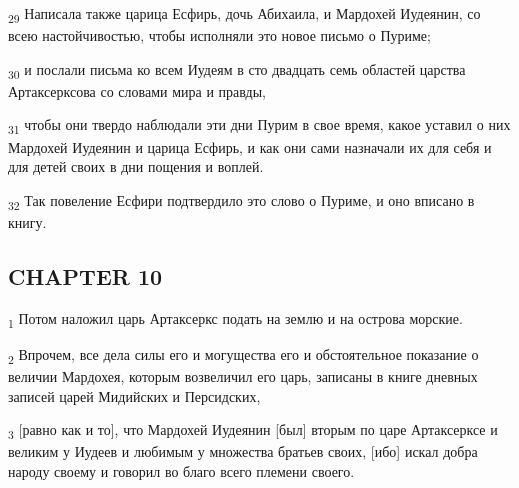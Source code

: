 \begin{tcolorbox}
\textsubscript{29} Написала также царица Есфирь, дочь Абихаила, и Мардохей Иудеянин, со всею настойчивостью, чтобы исполняли это новое письмо о Пуриме;
\end{tcolorbox}
\begin{tcolorbox}
\textsubscript{30} и послали письма ко всем Иудеям в сто двадцать семь областей царства Артаксерксова со словами мира и правды,
\end{tcolorbox}
\begin{tcolorbox}
\textsubscript{31} чтобы они твердо наблюдали эти дни Пурим в свое время, какое уставил о них Мардохей Иудеянин и царица Есфирь, и как они сами назначали их для себя и для детей своих в дни пощения и воплей.
\end{tcolorbox}
\begin{tcolorbox}
\textsubscript{32} Так повеление Есфири подтвердило это слово о Пуриме, и оно вписано в книгу.
\end{tcolorbox}
\subsection{CHAPTER 10}
\begin{tcolorbox}
\textsubscript{1} Потом наложил царь Артаксеркс подать на землю и на острова морские.
\end{tcolorbox}
\begin{tcolorbox}
\textsubscript{2} Впрочем, все дела силы его и могущества его и обстоятельное показание о величии Мардохея, которым возвеличил его царь, записаны в книге дневных записей царей Мидийских и Персидских,
\end{tcolorbox}
\begin{tcolorbox}
\textsubscript{3} [равно как и то], что Мардохей Иудеянин [был] вторым по царе Артаксерксе и великим у Иудеев и любимым у множества братьев своих, [ибо] искал добра народу своему и говорил во благо всего племени своего.
\end{tcolorbox}

